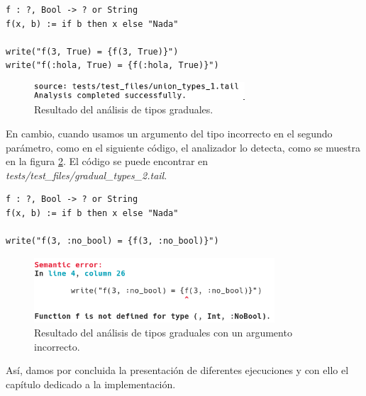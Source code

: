 \begin{lstlisting}[style=tail]
f : ?, Bool -> ? or String
f(x, b) := if b then x else "Nada"

write("f(3, True) = {f(3, True)}")
write("f(:hola, True) = {f(:hola, True)}")
\end{lstlisting}

\begin{figure}[H]
	\begin{center}
		\includegraphics[width=0.7\textwidth]{imagenes/grad1.png}
		\caption{Resultado del análisis de tipos graduales.}
		\label{fig:grad1}
	\end{center}
\end{figure}

En cambio, cuando usamos un argumento del tipo incorrecto en el segundo parámetro, como en el siguiente código, el analizador lo detecta, como se muestra en la figura \ref{fig:grad2}. El código se puede encontrar en \textit{tests/test\_files/gradual\_types\_2.tail}.\\

\begin{lstlisting}[style=tail]
f : ?, Bool -> ? or String
f(x, b) := if b then x else "Nada"

write("f(3, :no_bool) = {f(3, :no_bool)}")
\end{lstlisting}

\begin{figure}[H]
	\begin{center}
		\includegraphics[width=0.8\textwidth]{imagenes/grad2.png}
		\caption{Resultado del análisis de tipos graduales con un argumento incorrecto.}
		\label{fig:grad2}
	\end{center}
\end{figure}

Así, damos por concluida la presentación de diferentes ejecuciones y con ello el capítulo dedicado a la implementación.\\